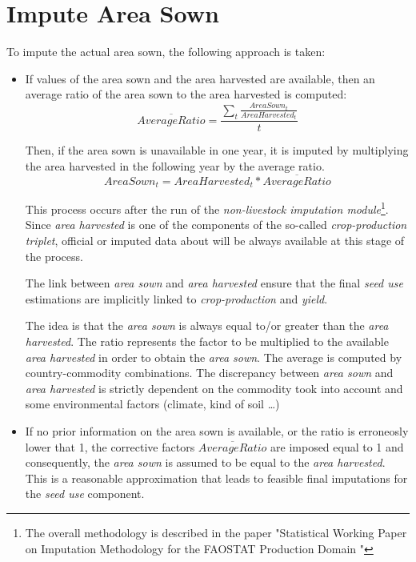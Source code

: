 \documentclass[nojss]{jss}
\begin{document}
\section{Impute Area Sown}
To impute the actual area sown, the following approach is taken:

\begin{itemize}
\item {If values of the area sown and the area harvested are available, then an average ratio of the area
sown to the area harvested is computed:
\begin{dmath}
\overline{AverageRatio}= \frac{\sum_{t} \frac{AreaSown_{t}}{AreaHarvested_{t}}}{t}
\end{dmath}


Then, if the area sown is unavailable in one year, it is
imputed by multiplying the area harvested in the following year by the average ratio. 
\begin{dmath}
AreaSown_{t}=AreaHarvested_{t}*\overline{AverageRatio}
\end{dmath}

This process occurs after the run of the \textit{non-livestock imputation module}\footnote{The overall methodology is described in the paper "Statistical Working Paper on Imputation Methodology for the FAOSTAT Production Domain "}. Since \textit{area harvested} is one of the components of the so-called \textit{crop-production triplet}, official or imputed data about  will be always available at this stage of the process.

The link between \textit{area sown} and \textit{area harvested} ensure that the final \textit{seed use} estimations are implicitly linked to \textit{crop-production} and \textit{yield}.

The idea is that the \textit{area sown} is always equal to/or greater than the \textit{area harvested}. The ratio represents the factor to be multiplied to the available \textit{area harvested} in order to obtain the \textit{area sown}. The average is computed by country-commodity combinations. The discrepancy between \textit{area sown} and \textit{area harvested} is strictly dependent on the commodity took into account and some environmental factors (climate, kind of soil \dots)}

\item{If no prior information on the area sown is available, or the ratio is erroneosly lower that 1, the corrective factors $\overline{AverageRatio}$ are imposed equal to 1 and consequently, the \textit{area sown} is assumed to be equal to the \textit{area harvested}. This is a reasonable approximation that leads to feasible final imputations for the \textit{seed use} component.}
\end{itemize}
\end{document}
